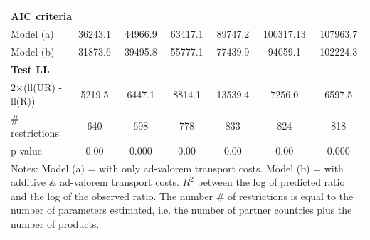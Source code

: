 \documentclass[a4paper,11pt]{article}
\begin{document}
\begin{table}[htbp]
\begin{center}
{\begin{tabular}{l|cccccc}
\multicolumn{7}{l}{\textbf{AIC criteria} }  \\ \hline
Model (a)& \multicolumn{1}{c}{36243.1} & \multicolumn{1}{c}{44966.9} & \multicolumn{1}{c}{63417.1} & \multicolumn{1}{c}{89747.2} & \multicolumn{1}{c}{100317.13} & \multicolumn{1}{c}{107963.7} \\
Model (b) & \multicolumn{1}{c}{31873.6} & \multicolumn{1}{c}{39495.8} & \multicolumn{1}{c}{55777.1} & \multicolumn{1}{c}{77439.9} & \multicolumn{1}{c}{94059.1} & \multicolumn{1}{c}{102224.3}  \\ \hline
\multicolumn{7}{l}{\textbf{Test LL} }    \\ \hline
2$\times$(ll(UR) -ll(R)) & \multicolumn{1}{c}{5219.5} & \multicolumn{1}{c}{6447.1} & \multicolumn{1}{c}{8814.1} & \multicolumn{1}{c}{13539.4} & \multicolumn{1}{c}{7256.0} & \multicolumn{1}{c}{6597.5}  \\
\# restrictions  & \multicolumn{1}{c}{640} & \multicolumn{1}{c}{698} & \multicolumn{1}{c}{778} & \multicolumn{1}{c}{833} & \multicolumn{1}{c}{824} & \multicolumn{1}{c}{818}  \\
p-value & \multicolumn{1}{c}{0.00} & \multicolumn{1}{c}{0.000} & \multicolumn{1}{c}{0.00} & \multicolumn{1}{c}{0.00} & \multicolumn{1}{c}{0.00} & \multicolumn{1}{c}{0.000} \\
\hline\hline
\multicolumn{7}{l}{\parbox[l]{13cm}{ \vspace{7pt}\scriptsize{Notes: Model (a) = with only ad-valorem transport costs.
Model (b) = with additive \& ad-valorem
transport costs.
$R^{2}$ between the log of predicted ratio and the log of the observed ratio.
The number \# of restrictions is equal to the number of parameters estimated, i.e. the number of partner countries plus the number of products.}}}
\end{tabular}%
}
\end{center}
\end{table}%
\end{document}
